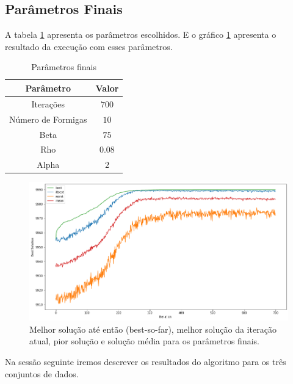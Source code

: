 \documentclass[10pt,twocolumn,letterpaper]{article}
\begin{document}
\subsection{Parâmetros Finais}

A tabela \ref{tab:param} apresenta os parâmetros escolhidos. E o gráfico \ref{fig:final} apresenta o resultado da execução com esses parâmetros.

\begin{table}[H]
   \caption{Parâmetros finais}
   \centering
   \begin{tabular}{|c|c|}
      \hline
      Parâmetro          & Valor  \\
      \hline\hline
      Iterações          & $700$  \\
      \hline
      Número de Formigas & $10$   \\
      \hline
      Beta               & $75$   \\
      \hline
      Rho                & $0.08$ \\
      \hline
      Alpha              & $2$    \\
      \hline
   \end{tabular}
   \label{tab:param}

\end{table}

\begin{figure}[H]
   \begin{center}
      \includegraphics[width=\linewidth]{final}
   \end{center}
   \caption{Melhor solução até então (best-so-far), melhor solução da iteração atual, pior solução e solução média para os parâmetros finais.}
   \label{fig:final}
\end{figure}


Na sessão seguinte iremos descrever os resultados do algoritmo para os três conjuntos de dados.
\end{document}
